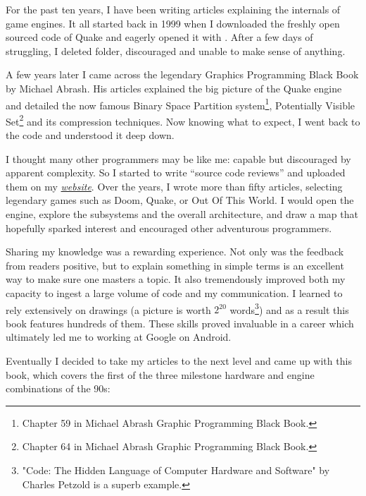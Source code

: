 \documentclass[book.tex]{subfiles}
\begin{document}
For the past ten years, I have been writing articles explaining the internals of game engines. It all started back in 1999 when I downloaded the freshly open sourced code of \mbox{Quake} and eagerly opened it with . After a few days of struggling, I deleted  folder, discouraged and unable to make sense of anything.

\bigskip

A few years later I came across the legendary Graphics Programming Black Book by Michael Abrash. His articles explained the big picture of the Quake engine and detailed the now famous Binary Space Partition system\footnote{Chapter 59 in Michael Abrash Graphic Programming Black Book.}, Potentially Visible Set\footnote{Chapter 64 in Michael Abrash Graphic Programming Black Book.} and its compression techniques. Now knowing what to expect, I went back to the code and understood it deep down.

\bigskip

I thought many other programmers may be like me: capable but discouraged by apparent complexity. So I started to write ``source  code reviews'' and uploaded them on my
\href{http://fabiensanglard.net}{\textit{website}}. Over the years, I wrote more than fifty articles, selecting legendary games such as Doom, Quake, or Out Of This World. I would open the engine, explore the subsystems and the overall architecture, and draw a map that hopefully sparked interest and encouraged other adventurous programmers.

\bigskip

Sharing my knowledge was a rewarding experience. Not only was the feedback from readers positive, but to explain something in simple terms is an excellent way to make sure one masters a topic. It also tremendously improved both my capacity to ingest a large volume of code and my communication. I learned to rely extensively on drawings (a picture is worth $2^{20}$ words\footnote{"Code: The Hidden Language of Computer Hardware and Software" by Charles Petzold is a superb example.}) and as a result this book features hundreds of them. These skills proved invaluable in a career which ultimately led me to working at Google on Android.

\newpage

Eventually I decided to take my articles to the next level and came up with this book, which covers the first of the three milestone hardware and engine combinations of the 90s:
\end{document}
